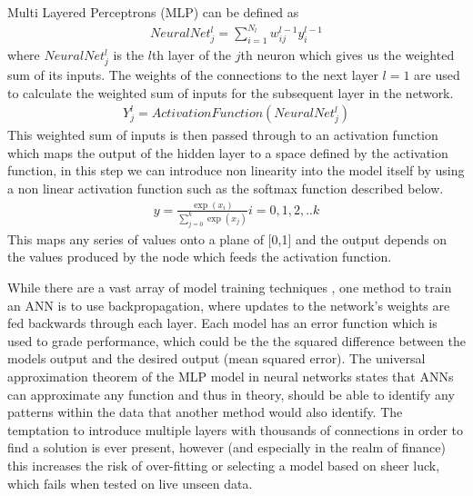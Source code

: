 \documentclass[11pt]{article}
\begin{document}
Multi Layered Perceptrons (MLP) can be defined as 
\begin{align}
NeuralNet^{l}_{j} =  \sum^{N_{l}}_{i = 1}w^{l-1}_{ij} y^{l-1}_{i}  
\end{align}
where $NeuralNet^{l}_{j}$ is the $l$th layer of the $j$th neuron which gives us the weighted sum of its inputs. The weights of the connections to the next layer $l=1$ are used to calculate the weighted sum of inputs for the subsequent layer in the network.  \begin{align}
Y^{l}_{j} =  ActivationFunction(NeuralNet^{l}_{j})  
\end{align} 
This weighted sum of inputs is then passed through to an activation function which maps the output of the hidden layer to a space defined by the activation function, in this step we can introduce non linearity into the model itself by using a non linear activation function such as the softmax function described below.
\begin{align}
y =  \frac{\exp(x_{i})}{\sum^{k}_{j=0}\exp(x_{j}) } 
i = 0,1,2,..k
\end{align} 
This maps any series of values onto a plane of [0,1] and the output depends on the values produced by the node which feeds the activation function. \par While there are a vast array of model training techniques , one method to train an ANN is to use backpropagation, where updates to the network's weights are fed backwards through each layer. Each model has an error function which is used to grade performance, which could be the the squared difference between the models output and the desired output (mean squared error).  \newline The universal approximation theorem \cite{Kurkova1992} of the MLP model in neural networks states that ANNs can approximate any function and thus in theory, should be able to identify any patterns within the data that another method would also identify. \newline The temptation to introduce multiple layers with thousands of connections in order to find a solution is ever present, however (and especially in the realm of finance) this increases the risk of over-fitting or selecting a model based on sheer luck, which fails when tested on live unseen data.
\end{document}
